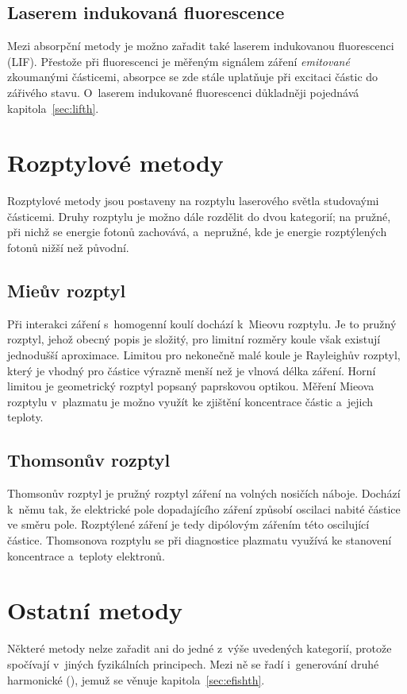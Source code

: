 \subsection{Laserem indukovaná fluorescence}
\label{sec:diagnostics-lif}
Mezi absorpční metody je možno zařadit také laserem indukovanou fluorescenci
(LIF).
Přestože při fluorescenci je měřeným signálem záření \emph{emitované}
zkoumanými částicemi, absorpce se zde stále uplatňuje při excitaci částic
do zářivého stavu.
O~laserem indukované fluorescenci důkladněji pojednává
kapitola~\ref{sec:lifth}.

\section{Rozptylové metody}
\label{sec:diagnostics-scattering}
Rozptylové metody jsou postaveny na rozptylu laserového světla
studovaými částicemi.
Druhy rozptylu je možno dále rozdělit do dvou kategorií;
na pružné, při nichž se energie fotonů zachovává,
a~nepružné, kde je energie rozptýlených fotonů nižší než původní.

\subsection{Mieův rozptyl}
\label{sec:diagnostics-mie}
Při interakci záření s~homogenní koulí dochází k~Mieovu rozptylu.
Je to pružný rozptyl, jehož obecný popis je složitý,
pro limitní rozměry koule však existují jednodušší aproximace.
Limitou pro nekonečně malé koule je Rayleighův rozptyl,
který je vhodný pro částice výrazně menší než je vlnová délka záření.
Horní limitou je geometrický rozptyl popsaný paprskovou optikou.
Měření Mieova rozptylu v~plazmatu je možno využít ke zjištění
koncentrace částic a~jejich teploty.
\autocite{wiki-mie}

\subsection{Thomsonův rozptyl}
\label{sec:diagnostics-thomson}
Thomsonův rozptyl je pružný rozptyl záření na volných nosičích náboje.
Dochází k~němu tak, že elektrické pole dopadajícího záření způsobí
oscilaci nabité částice ve směru pole.
Rozptýlené záření je tedy dipólovým zářením této oscilující částice.
Thomsonova rozptylu se při diagnostice plazmatu
využívá ke stanovení koncentrace a~teploty elektronů.
\autocite{wiki-thomson}


\section{Ostatní metody}
\label{sec:diagnostics-misc}
Některé metody nelze zařadit ani do jedné z~výše uvedených kategorií,
protože spočívají v~jiných fyzikálních principech.
Mezi ně se řadí i~generování druhé harmonické (\EFISH),
jemuž se věnuje kapitola~\ref{sec:efishth}.
